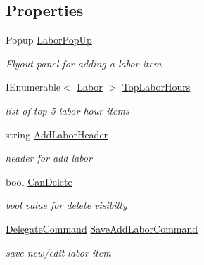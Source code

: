 \subsection*{Properties}
\begin{DoxyCompactItemize}
\item 
Popup \hyperlink{class_field_service_1_1_win_r_t_1_1_view_models_1_1_labor_view_model_a2e946b2cbc80eaf53d69e9d705ed46d4}{Labor\+Pop\+Up}
\begin{DoxyCompactList}\small\item\em Flyout panel for adding a labor item \end{DoxyCompactList}\item 
I\+Enumerable$<$ \hyperlink{class_field_service_1_1_data_1_1_labor}{Labor} $>$ \hyperlink{class_field_service_1_1_win_r_t_1_1_view_models_1_1_labor_view_model_aaf06d26d7e7ef699a754d44dfb43a8ca}{Top\+Labor\+Hours}
\begin{DoxyCompactList}\small\item\em list of top 5 labor hour items \end{DoxyCompactList}\item 
string \hyperlink{class_field_service_1_1_win_r_t_1_1_view_models_1_1_labor_view_model_ab92617f31839467e858408f8ffe7d455}{Add\+Labor\+Header}
\begin{DoxyCompactList}\small\item\em header for add labor \end{DoxyCompactList}\item 
bool \hyperlink{class_field_service_1_1_win_r_t_1_1_view_models_1_1_labor_view_model_a5288b36677ea9a09de70c897d78e1245}{Can\+Delete}
\begin{DoxyCompactList}\small\item\em bool value for delete visibilty \end{DoxyCompactList}\item 
\hyperlink{class_delegate_command}{Delegate\+Command} \hyperlink{class_field_service_1_1_win_r_t_1_1_view_models_1_1_labor_view_model_a21b4370b03b586c9bf26e95d11b9b4e5}{Save\+Add\+Labor\+Command}
\begin{DoxyCompactList}\small\item\em save new/edit labor item \end{DoxyCompactList}\item 

\end{DoxyCompactItemize}
